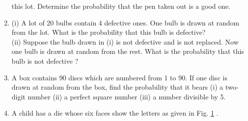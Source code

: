 \begin{enumerate}[label=\arabic*.,ref=\thesubsection.\theenumi]
this lot. Determine the probability that the pen taken out is a good one.
\\
\solution

\item (i) A lot of 20 bulbs contain 4 defective ones. One bulb is drawn at random from the lot.
What is the probability that this bulb is defective?\\
(ii) Suppose the bulb drawn in (i) is not defective and is not replaced. Now one bulb
is drawn at random from the rest. What is the probability that this bulb is not
defective ?
\\
\solution

\item A box contains 90 discs which are numbered from 1 to 90. If one disc is drawn at random
from the box, find the probability that it bears (i) a two-digit number (ii) a perfect
square number (iii) a number divisible by 5.
\\
\solution

\item A child has a die whose six faces show the letters as given in Fig. \ref{fig:130_dice}	.

\begin{figure}[!ht]
\centering
\resizebox{\columnwidth}{!}{}
\caption{}
\label{fig:130_dice}	
\end{figure}


\end{enumerate}
